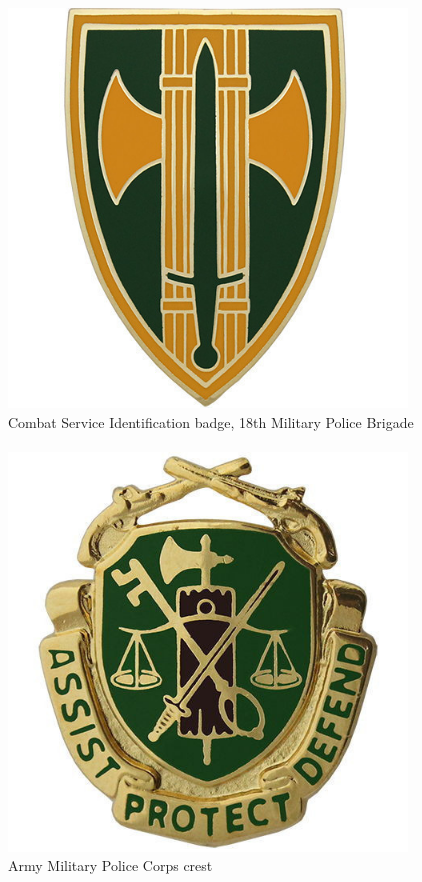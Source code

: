 \begin{frame}
    \begin{columns}[onlytextwidth]
            \includegraphics[width=0.8\textwidth]{img/18th-mp-brigade-badge.jpg} \\
            Combat Service Identification badge, 18th Military Police Brigade \\

            \\

            \includegraphics[width=0.8\textwidth]{img/army-mp-crest.jpg} \\
            Army Military Police Corps crest \\
    \end{columns}
\end{frame}

